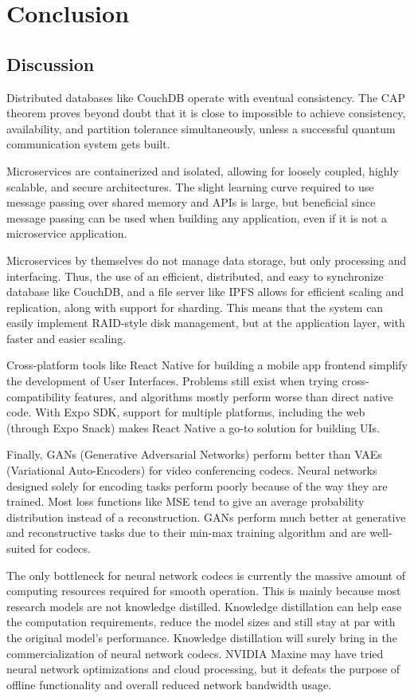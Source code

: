 \chapter{\centering Conclusion}

\section{Discussion}
Distributed databases like CouchDB operate with eventual consistency. The CAP theorem proves beyond doubt that it is close to impossible 
to achieve consistency, availability, and partition tolerance simultaneously, unless a successful quantum communication system gets built.

Microservices are containerized and isolated, allowing for loosely coupled, highly scalable, and secure architectures. The slight learning curve required 
to use message passing over shared memory and APIs is large, but beneficial since message passing can be used when building any application, even if it is 
not a microservice application.

Microservices by themselves do not manage data storage, but only processing and interfacing. Thus, the use of an efficient, distributed, and easy to synchronize database like CouchDB, and a file server like IPFS allows for efficient scaling and replication, along with support for sharding. This means that the system can 
easily implement RAID-style disk management, but at the application layer, with faster and easier scaling.

Cross-platform tools like React Native for building a mobile app frontend simplify the development of User Interfaces. Problems still exist when trying cross-compatibility features, and algorithms mostly perform worse than direct native code. With Expo SDK, support for multiple platforms, including 
the web (through Expo Snack) makes React Native a go-to solution for building UIs.

Finally, GANs (Generative Adversarial Networks) perform better than VAEs (Variational Auto-Encoders) for video conferencing codecs. 
Neural networks designed solely for encoding tasks perform poorly because of the way they are trained. Most loss functions like MSE tend to give an average probability distribution instead of a reconstruction. GANs perform much better at generative and reconstructive tasks due to their min-max training algorithm and are well-suited for codecs.

The only bottleneck for neural network codecs is currently the massive amount of computing resources required for smooth operation. This is mainly because most research models are not knowledge distilled. Knowledge distillation can help ease the computation requirements, reduce the model sizes and still stay at par with the original model's performance. Knowledge distillation will surely bring in the commercialization of neural network codecs. NVIDIA Maxine may have tried neural 
network optimizations and cloud processing, but it defeats the purpose of offline functionality and overall reduced network bandwidth usage.

